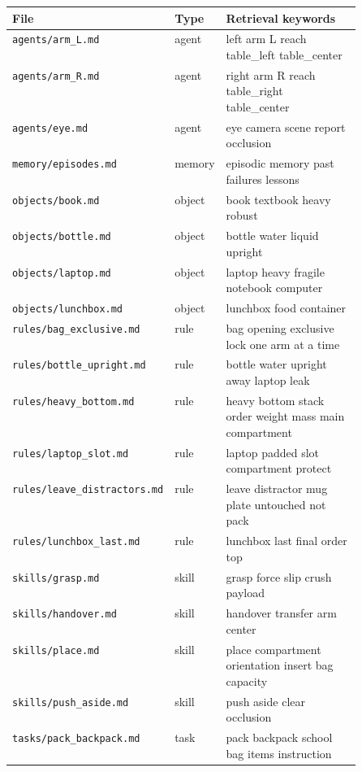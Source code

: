\begin{tabular}{llp{0.5\linewidth}}
\toprule
File & Type & Retrieval keywords \\
\midrule
\texttt{agents/arm\_L.md} & agent & left arm L reach table\_left table\_center \\
\texttt{agents/arm\_R.md} & agent & right arm R reach table\_right table\_center \\
\texttt{agents/eye.md} & agent & eye camera scene report occlusion \\
\texttt{memory/episodes.md} & memory & episodic memory past failures lessons \\
\texttt{objects/book.md} & object & book textbook heavy robust \\
\texttt{objects/bottle.md} & object & bottle water liquid upright \\
\texttt{objects/laptop.md} & object & laptop heavy fragile notebook computer \\
\texttt{objects/lunchbox.md} & object & lunchbox food container \\
\texttt{rules/bag\_exclusive.md} & rule & bag opening exclusive lock one arm at a time \\
\texttt{rules/bottle\_upright.md} & rule & bottle water upright away laptop leak \\
\texttt{rules/heavy\_bottom.md} & rule & heavy bottom stack order weight mass main compartment \\
\texttt{rules/laptop\_slot.md} & rule & laptop padded slot compartment protect \\
\texttt{rules/leave\_distractors.md} & rule & leave distractor mug plate untouched not pack \\
\texttt{rules/lunchbox\_last.md} & rule & lunchbox last final order top \\
\texttt{skills/grasp.md} & skill & grasp force slip crush payload \\
\texttt{skills/handover.md} & skill & handover transfer arm center \\
\texttt{skills/place.md} & skill & place compartment orientation insert bag capacity \\
\texttt{skills/push\_aside.md} & skill & push aside clear occlusion \\
\texttt{tasks/pack\_backpack.md} & task & pack backpack school bag items instruction \\
\bottomrule
\end{tabular}
